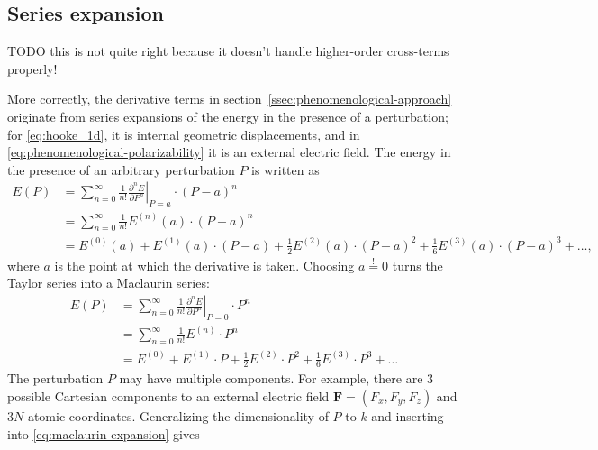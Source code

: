 \documentclass[%
class = book,%
crop = false,%
float = true,%
multi = true,%
preview = false,%
]{standalone}
\begin{document}
\subsection{Series expansion}
\label{ssec:series-expansion}
TODO this is not quite right because it doesn't handle higher-order cross-terms properly!

More correctly, the derivative terms in section~\ref{ssec:phenomenological-approach} originate from series expansions of the energy in the presence of a perturbation; for \eqref{eq:hooke_1d}, it is internal geometric displacements, and in \eqref{eq:phenomenological-polarizability} it is an external electric field. The energy in the presence of an arbitrary perturbation \(P\) is written as
\begin{equation}
  \label{eq:taylor-expansion}
  \begin{aligned}
    E(P) &= \sum_{n = 0}^{\infty} \frac{1}{n!} \left. \frac{\partial^{n} E}{\partial P^{n}} \right|_{P = a} \cdot (P - a)^{n} \\
    &= \sum_{n = 0}^{\infty} \frac{1}{n!} E^{(n)}(a) \cdot (P - a)^{n} \\
    &= E^{(0)}(a) + E^{(1)}(a) \cdot (P - a) + \frac{1}{2} E^{(2)}(a) \cdot (P - a)^{2} + \frac{1}{6} E^{(3)}(a) \cdot (P - a)^{3} + \dots ,
  \end{aligned}
\end{equation}
where \(a\) is the point at which the derivative is taken. Choosing \(a \overset{!}{=} 0\) turns the Taylor series into a Maclaurin series:
\begin{equation}
  \label{eq:maclaurin-expansion}
  \begin{aligned}
    E(P) &= \sum_{n = 0}^{\infty} \frac{1}{n!} \left. \frac{\partial^{n} E}{\partial P^{n}} \right|_{P = 0} \cdot P^{n} \\
    &= \sum_{n = 0}^{\infty} \frac{1}{n!} E^{(n)} \cdot P^{n} \\
    &= E^{(0)} + E^{(1)} \cdot P + \frac{1}{2} E^{(2)} \cdot P^{2} + \frac{1}{6} E^{(3)} \cdot P^{3} + \dots
  \end{aligned}
\end{equation}
The perturbation \(P\) may have multiple components. For example, there are 3 possible Cartesian components to an external electric field \(\mathbf{F} = (F_{x}, F_{y}, F_{z})\) and \(3N\) atomic coordinates. Generalizing the dimensionality of \(P\) to \(k\) and inserting into \eqref{eq:maclaurin-expansion} gives
\end{document}
